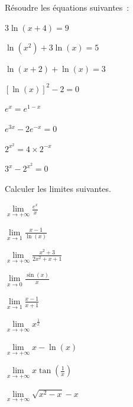 \begin{exo}
    Résoudre les équations suivantes~:
    \begin{examplescol}{2}
        \item $3\ln \left( x+4\right) =9$
        \item $\ln \left( x^{2}\right) +3\ln \left( x\right) =5$
        \item $\ln \left( x+2\right) +\ln \left( x\right) =3$
        \item $\left[ \ln \left( x\right) \right] ^{2}-2=0$

        \item $e^{x}=e^{1-x}$
        \item $e^{3x}-2e^{-x}=0$
        \item $2^{x^{2}}=4\times2^{-x}$
        \item $3^{x}-2^{x^{2}}=0$
    \end{examplescol}
\end{exo}

\begin{exo}
    Calculer les limites suivantes.
    \begin{examplescol}{3}
        \item $\displaystyle \underset{x \to +\infty}{\lim} \frac{e^{x}}{x}$
        \item $\displaystyle \underset{x \to 1}{\lim} \frac{x-1}{\ln(x)} $
        \item $\displaystyle \underset{x \to +\infty}{\lim} \frac{x^{2}+3}{2x^{2}+x+1} $
        \item $\displaystyle \underset{x \to 0}{\lim} \frac{\sin(x)}{x} $
        \item $\displaystyle \underset{x \to 1}{\lim} \frac{x-1}{x+1} $
        \item $\displaystyle \underset{x \to +\infty}{\lim} x^{\frac{1}{x}} $
        \item $\displaystyle \underset{x \to +\infty}{\lim} x-\ln(x) $
        \item $\displaystyle \underset{x \to +\infty}{\lim} x\tan(\frac{1}{x}) $
        \item $\displaystyle \underset{x \to +\infty}{\lim} \sqrt{x^{2}-x}-x $
    \end{examplescol}
\end{exo}

